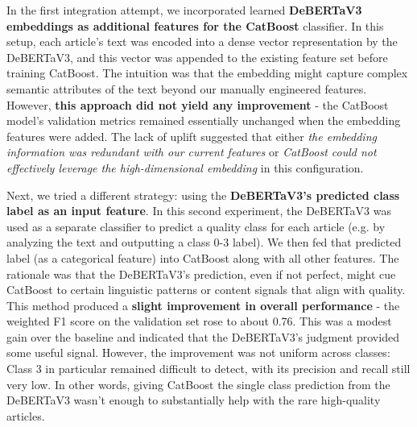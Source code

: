 In the first integration attempt, we incorporated learned \textbf{\ac{DeBERTaV3} embeddings as additional features for the \ac{CatBoost}} classifier. In this setup, each article's text was encoded into a dense vector representation by the \ac{DeBERTaV3}, and this vector was appended to the existing feature set before training \ac{CatBoost}. The intuition was that the embedding might capture complex semantic attributes of the text beyond our manually engineered features. However, \textbf{this approach did not yield any improvement} - the \ac{CatBoost} model's validation metrics remained essentially unchanged when the embedding features were added. The lack of uplift suggested that either \textit{the embedding information was redundant with our current features} or \textit{\ac{CatBoost} could not effectively leverage the high-dimensional embedding} in this configuration. 

Next, we tried a different strategy: using the \textbf{\ac{DeBERTaV3}'s predicted class label as an input feature}. In this second experiment, the \ac{DeBERTaV3} was used as a separate classifier to predict a quality class for each article (e.g. by analyzing the text and outputting a class 0-3 label). We then fed that predicted label (as a categorical feature) into \ac{CatBoost} along with all other features. The rationale was that the  \ac{DeBERTaV3}'s prediction, even if not perfect, might cue \ac{CatBoost} to certain linguistic patterns or content signals that align with quality. This method produced a \textbf{slight improvement in overall performance} - the weighted F1 score on the validation set rose to about 0.76. This was a modest gain over the baseline and indicated that the \ac{DeBERTaV3}'s judgment provided some useful signal. However, the improvement was not uniform across classes: \ac{Class 3} in particular remained difficult to detect, with its precision and recall still very low. In other words, giving \ac{CatBoost} the single class prediction from the  \ac{DeBERTaV3} wasn't enough to substantially help with the rare high-quality articles. 

